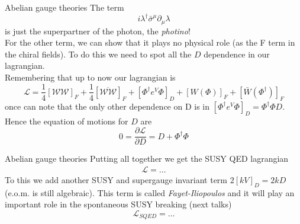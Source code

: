 \documentclass[10pt]{beamer}
\begin{document}
\begin{frame}{Abelian gauge theories}
The term 
\begin{equation*}
    i\lambda^{\dagger} \bar\sigma^{\mu}\partial_{\mu} \lambda
\end{equation*}
is just the superpartner of the photon, the \emph{photino}! \\
For the other term, we can show that it plays no physical role (as the F term in the chiral fields). To do this we need to spot all the $D$ dependence in our lagrangian. \\
Remembering that up to now our lagrangian is 
\begin{equation*}
    \mathcal{L} = \frac{1}{4}\left[\mathcal{WW}\right]_F + \frac{1}{4} \left[\overline{\mathcal{WW}}\right]_F + \left[\Phi^{\dagger} e^V \Phi\right]_D + [W(\Phi)]_F + [\bar W(\Phi^{\dagger})]_F
\end{equation*}
once can note that the only other dependence on D is in $\left[\Phi^{\dagger} e^V \Phi \right]_D = \Phi^{\dagger}\Phi D$.
Hence the equation of motions for $D$ are
\begin{equation*}
    0 = \frac{\partial \mathcal{L}}{\partial D} = D + \Phi^{\dagger} \Phi 
\end{equation*}
\end{frame}

\begin{frame}{Abelian gauge theories}
Putting all together we get the SUSY QED lagrangian 
\begin{gather*}
    \mathcal{L} = \dots
\end{gather*}
To this we add another SUSY and supergauge invariant term $2[kV]_D = 2kD$ (e.o.m. is still algebraic). 
This term is called \emph{Fayet-Iliopoulos} and it will play an important role in the spontaneous SUSY breaking (next talks)
\begin{equation*}
    \boxed{\mathcal{L}_{SQED} = \dots}
\end{equation*}
\end{frame}
\end{document}
